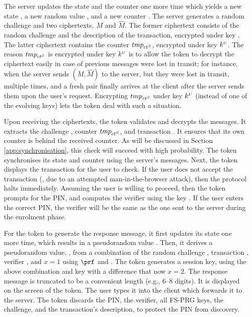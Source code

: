 The server updates the state and the counter one more time which yields a new state \VS{\state}, a new random value , and a new counter \VS{\counter}. The server generates a random challenge and two ciphertexts, $\ddot M$ and $\hat M$. The former ciphertext consists of the random challenge and the description of the transaction, encrypted under key . The latter ciphertext contains the counter ${tmp}_{{ct}^{\scriptscriptstyle S}}$, encrypted under key $k^{\scriptscriptstyle U}$. The reason ${tmp}_{{ct}^{\scriptscriptstyle S}}$ is encrypted under key $k^{\scriptscriptstyle U}$ is to allow the token to decrypt the ciphertext easily 
in case of previous messages were lost in transit; for instance, when the server sends $(\ddot M, \hat M)$ to the server, but they were lost in transit, multiple times, and a fresh pair finally arrives at the client after the server sends them upon the user's request. Encrypting ${tmp}_{{ct}^{\scriptscriptstyle S}}$ under key $k^{\scriptscriptstyle U}$ (instead of one of the evolving keys) lets the token deal with such a situation. 




Upon receiving the ciphertexts, the token validates and decrypts the messages. It extracts the challenge \VM{\nonce}, counter ${tmp}_{{ct}^{\scriptscriptstyle S}}$, and transaction \VM{\trans}. It ensures that its own counter is behind the received counter. As will be discussed in Section \ref{app:synchronisation}, this check will succeed with high probability. The token synchronises its state and counter using the server's messages. Next, the token displays the transaction for the user to check. If the user does not accept the transaction (\eg, due to an attempted man-in-the-browser attack), then the protocol halts immediately. Assuming the user is willing to proceed, then the token prompts for the PIN, and computes the verifier \VC{\verifier} using the key \VC{\salt}. If the user enters the correct PIN, the verifier will be the same as the one sent to the server during the enrolment phase.



For the token to generate the response message, it first updates its state one more time, which results in a pseudorandom value . Then, it derives a pseudorandom value, , from a combination of the random challenge \VM{\nonce}, transaction \VM{\trans}, verifier \VC{\verifier}, and $x=1$  using $\prf$ and . The token generates a session key, using the above combination and key with a difference that now $x=2$. The response message is truncated to be a convenient length (e.g., 6--8 digits). It is displayed on the screen of the token. The user types it into the client which forwards it to the server. The token discards the PIN, the verifier, all FS-PRG keys, the challenge, and the transaction's description, to protect the PIN from discovery. 

